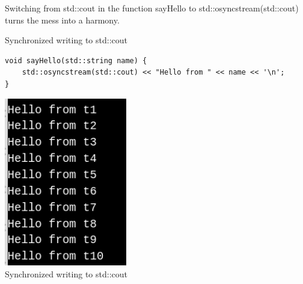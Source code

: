 Switching from std::cout in the function sayHello to std::osyncstream(std::cout) turns the mess into a harmony.

\noindent
Synchronized writing to std::cout
\begin{lstlisting}[style=styleCXX]
void sayHello(std::string name) {
	std::osyncstream(std::cout) << "Hello from " << name << '\n';
}
\end{lstlisting}

\begin{center}
\includegraphics[width=0.4\textwidth]{content/2/chapter3/images/12.png}\\
Synchronized writing to std::cout
\end{center}
